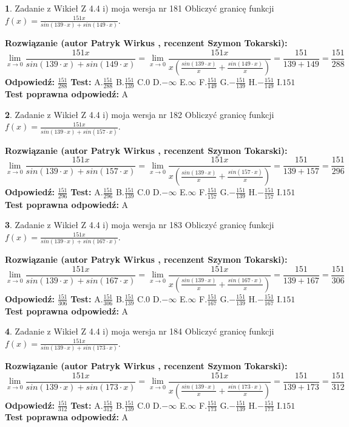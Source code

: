 \documentclass[12pt, a4paper]{article}
\theoremstyle{definition} %
\newtheorem{zad}{}
\newcommand{\zadStart}[1]{\begin{zad}#1\newline}
\newcommand{\zadStop}{\end{zad}}
\newcommand{\rozwStart}[2]{\noindent \textbf{Rozwiązanie (autor #1 , recenzent #2): }\newline}
\newcommand{\rozwStop}{\newline}
\newcommand{\odpStart}{\noindent \textbf{Odpowiedź:}\newline}
\newcommand{\odpStop}{\newline}
\newcommand{\testStart}{\noindent \textbf{Test:}\newline}
\newcommand{\testStop}{\newline}
\newcommand{\kluczStart}{\noindent \textbf{Test poprawna odpowiedź:}\newline}
\newcommand{\kluczStop}{\newline}
\begin{document}
\zadStart{Zadanie z Wikieł Z 4.4 i) moja wersja nr 181}
Obliczyć granicę funkcji $f(x)=\frac{151x}{sin(139\cdot x) +sin(149\cdot x)}$.
\zadStop
\rozwStart{Patryk Wirkus}{Szymon Tokarski}
$$\lim\limits_{x\to 0}\frac{151x}{sin(139\cdot x) +sin(149\cdot x)}=\lim\limits_{x\to 0}\frac{151x}{x(\frac{sin(139\cdot x)}{x}+\frac{sin(149\cdot x)}{x})}=\frac{151}{139+149} = \frac{151}{288}$$
\rozwStop
\odpStart
$\frac{151}{288}$
\odpStop
\testStart
A.$\frac{151}{288}$
B.$\frac{151}{139}$
C.$0$
D.$-\infty$
E.$\infty$
F.$\frac{151}{149}$
G.$-\frac{151}{139}$
H.$-\frac{151}{149}$
I.$151$
\testStop
\kluczStart
A
\kluczStop



\zadStart{Zadanie z Wikieł Z 4.4 i) moja wersja nr 182}
Obliczyć granicę funkcji $f(x)=\frac{151x}{sin(139\cdot x) +sin(157\cdot x)}$.
\zadStop
\rozwStart{Patryk Wirkus}{Szymon Tokarski}
$$\lim\limits_{x\to 0}\frac{151x}{sin(139\cdot x) +sin(157\cdot x)}=\lim\limits_{x\to 0}\frac{151x}{x(\frac{sin(139\cdot x)}{x}+\frac{sin(157\cdot x)}{x})}=\frac{151}{139+157} = \frac{151}{296}$$
\rozwStop
\odpStart
$\frac{151}{296}$
\odpStop
\testStart
A.$\frac{151}{296}$
B.$\frac{151}{139}$
C.$0$
D.$-\infty$
E.$\infty$
F.$\frac{151}{157}$
G.$-\frac{151}{139}$
H.$-\frac{151}{157}$
I.$151$
\testStop
\kluczStart
A
\kluczStop



\zadStart{Zadanie z Wikieł Z 4.4 i) moja wersja nr 183}
Obliczyć granicę funkcji $f(x)=\frac{151x}{sin(139\cdot x) +sin(167\cdot x)}$.
\zadStop
\rozwStart{Patryk Wirkus}{Szymon Tokarski}
$$\lim\limits_{x\to 0}\frac{151x}{sin(139\cdot x) +sin(167\cdot x)}=\lim\limits_{x\to 0}\frac{151x}{x(\frac{sin(139\cdot x)}{x}+\frac{sin(167\cdot x)}{x})}=\frac{151}{139+167} = \frac{151}{306}$$
\rozwStop
\odpStart
$\frac{151}{306}$
\odpStop
\testStart
A.$\frac{151}{306}$
B.$\frac{151}{139}$
C.$0$
D.$-\infty$
E.$\infty$
F.$\frac{151}{167}$
G.$-\frac{151}{139}$
H.$-\frac{151}{167}$
I.$151$
\testStop
\kluczStart
A
\kluczStop



\zadStart{Zadanie z Wikieł Z 4.4 i) moja wersja nr 184}
Obliczyć granicę funkcji $f(x)=\frac{151x}{sin(139\cdot x) +sin(173\cdot x)}$.
\zadStop
\rozwStart{Patryk Wirkus}{Szymon Tokarski}
$$\lim\limits_{x\to 0}\frac{151x}{sin(139\cdot x) +sin(173\cdot x)}=\lim\limits_{x\to 0}\frac{151x}{x(\frac{sin(139\cdot x)}{x}+\frac{sin(173\cdot x)}{x})}=\frac{151}{139+173} = \frac{151}{312}$$
\rozwStop
\odpStart
$\frac{151}{312}$
\odpStop
\testStart
A.$\frac{151}{312}$
B.$\frac{151}{139}$
C.$0$
D.$-\infty$
E.$\infty$
F.$\frac{151}{173}$
G.$-\frac{151}{139}$
H.$-\frac{151}{173}$
I.$151$
\testStop
\kluczStart
A
\kluczStop
\end{document}
